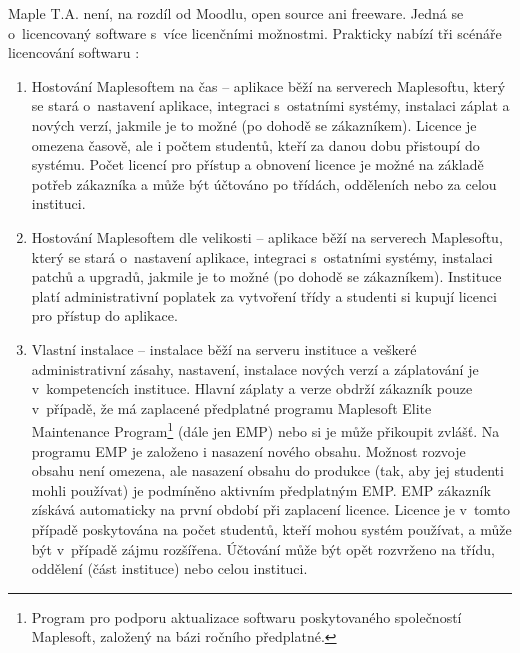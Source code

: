 \documentclass[
print,
  11pt,
  table,   
  nolof,    
  nolot,
  oneside,final
]{fithesis3}
\begin{document}
Maple T.A. není, na rozdíl od Moodlu, open source ani freeware. Jedná se o~licencovaný software s~více licenčními možnostmi. Prakticky nabízí tři scénáře licencování softwaru  \cite{mapletalicence}:
\begin{enumerate}
	\item Hostování Maplesoftem na čas -- aplikace běží na serverech Maplesoftu, který se stará o~nastavení aplikace, integraci s~ostatními systémy, instalaci záplat a nových verzí, jakmile je to možné (po dohodě se zákazníkem). Licence je omezena časově, ale i počtem studentů, kteří za danou dobu přistoupí do systému. Počet licencí pro přístup a obnovení licence je možné na základě potřeb zákazníka a může být účtováno po třídách, odděleních nebo za celou instituci.
	
	\item Hostování Maplesoftem dle velikosti -- aplikace běží na serverech Maplesoftu, který se stará o~nastavení aplikace, integraci s~ostatními systémy, instalaci patchů a upgradů, jakmile je to možné (po dohodě se zákazníkem). Instituce platí administrativní poplatek za vytvoření třídy a studenti si kupují licenci pro přístup do aplikace.
	
	\item Vlastní instalace -- instalace běží na serveru instituce a veškeré administrativní zásahy, nastavení, instalace nových verzí a záplatování je v~kompetencích instituce. Hlavní záplaty a verze obdrží zákazník pouze v~případě, že má zaplacené předplatné programu Maplesoft Elite Maintenance Program\footnote{Program pro podporu aktualizace softwaru poskytovaného společností Maplesoft, založený na bázi roč\-ního předplatné.} (dále jen EMP) nebo si je může přikoupit zvlášť. Na programu EMP je založeno i nasazení nového obsahu. Možnost rozvoje obsahu není omezena, ale nasazení obsahu do produkce (tak, aby jej studenti mohli používat) je podmíněno aktivním předplatným EMP. EMP zákazník získává automaticky na první období při zaplacení licence. Licence je v~tomto případě poskytována na počet studentů, kteří mohou systém používat, a může být v~případě zájmu rozšířena. Účtování může být opět rozvrženo na třídu, oddělení (část instituce) nebo celou instituci.
\end{enumerate}
\end{document}
